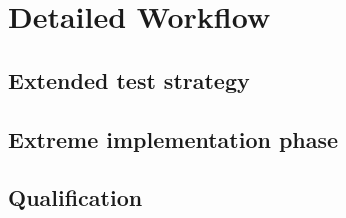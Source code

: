 \section{Detailed Workflow}\label{sec:detailed-workflow}


\subsection{Extended test strategy}\label{subsec:extended-test-strategy}

\subsection{Extreme implementation phase}\label{subsec:extreme-implementation-phase}

\subsection{Qualification}\label{subsec:qualification}
